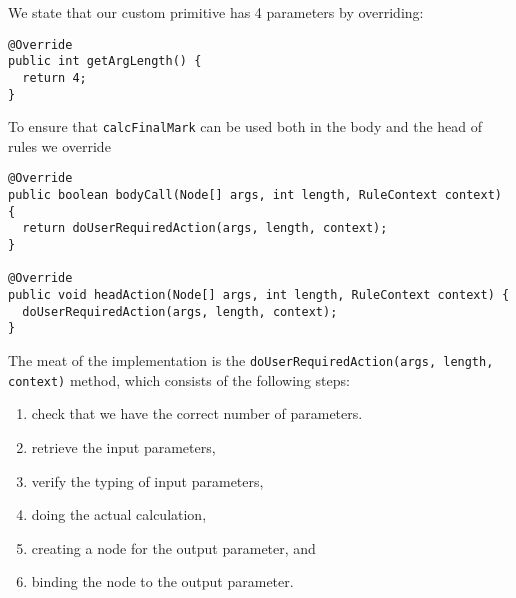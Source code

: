 \documentclass{amsart}
\begin{document}
We state that our custom primitive has 4 parameters by overriding:
\begin{small}
\begin{verbatim}
@Override
public int getArgLength() {
  return 4;
}
\end{verbatim}
\end{small}

To ensure that \texttt{calcFinalMark} can be used both in the body and the head of rules we override
\begin{small}
\begin{verbatim} 
@Override
public boolean bodyCall(Node[] args, int length, RuleContext context) {
  return doUserRequiredAction(args, length, context);
}
  
@Override
public void headAction(Node[] args, int length, RuleContext context) {
  doUserRequiredAction(args, length, context);
}    
\end{verbatim}
\end{small}

The meat of the implementation is the \texttt{doUserRequiredAction(args, length, context)} method, which consists of the following steps:
\begin{enumerate}
 \item check that we have the correct number of parameters.
 \item retrieve the input parameters,
 \item verify the typing of input parameters,
 \item doing the actual calculation,
 \item creating a node for the output parameter, and
 \item binding the node to the output parameter.
\end{enumerate}
\end{document}
